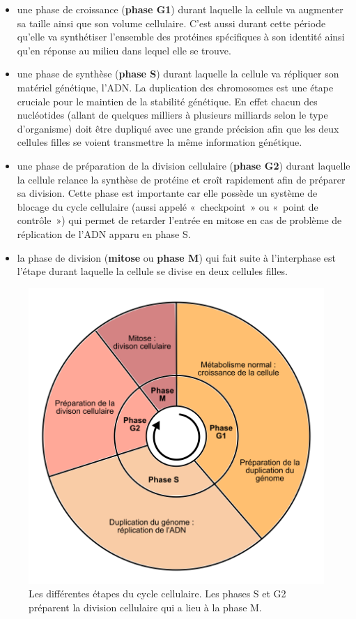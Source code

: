 \documentclass[12pt,a4paper,twoside,openright]{book}
\begin{document}
\begin{itemize}
\item
  une phase de croissance (\textbf{phase G1}) durant laquelle la cellule
  va augmenter sa taille ainsi que son volume cellulaire. C'est aussi
  durant cette période qu'elle va synthétiser l'ensemble des protéines
  spécifiques à son identité ainsi qu'en réponse au milieu dans lequel
  elle se trouve.
\item
  une phase de synthèse (\textbf{phase S}) durant laquelle la cellule va
  répliquer son matériel génétique, l'ADN. La duplication des
  chromosomes est une étape cruciale pour le maintien de la stabilité
  génétique. En effet chacun des nucléotides (allant de quelques
  milliers à plusieurs milliards selon le type d'organisme) doit être
  dupliqué avec une grande précision afin que les deux cellules filles
  se voient transmettre la même information génétique.
\item
  une phase de préparation de la division cellulaire (\textbf{phase G2})
  durant laquelle la cellule relance la synthèse de protéine et croît
  rapidement afin de préparer sa division. Cette phase est importante
  car elle possède un système de blocage du cycle cellulaire (aussi
  appelé «~checkpoint~» ou «~point de contrôle~») qui permet de retarder
  l'entrée en mitose en cas de problème de réplication de l'ADN apparu
  en phase S.
\item
  la phase de division (\textbf{mitose} ou \textbf{phase M}) qui fait
  suite à l'interphase est l'étape durant laquelle la cellule se divise
  en deux cellules filles.
\end{itemize}

\begin{figure}[htbp]
\centering
\includegraphics{figures/intro/cycle.png}
\caption{\label{fig:cycle}Les différentes étapes du cycle cellulaire.
Les phases S et G2 préparent la division cellulaire qui a lieu à la
phase M.}
\end{figure}
\end{document}
